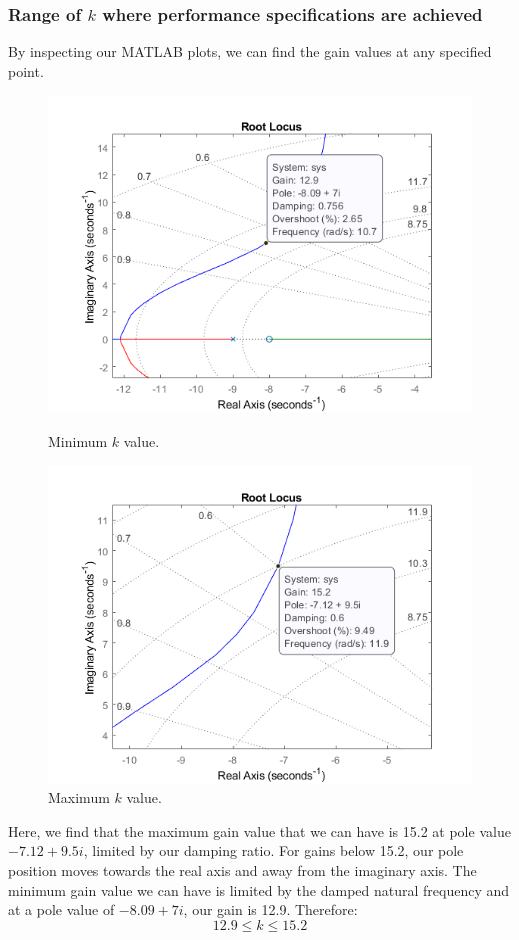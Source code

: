 \documentclass[11pt]{article}
\numberwithin{equation}{section}
\begin{document}
\subsubsection{Range of $k$ where performance specifications are achieved}
By inspecting our MATLAB plots, we can find the gain values at any specified point.
\begin{figure}[H]
    \centering
    \begin{minipage}{.5\textwidth}
        \centering
        \includegraphics[width = \linewidth]{./img/q3ciii1.png}
        \caption{Minimum $k$ value.}
        \label{q3ciii1}
    \end{minipage}%
    \begin{minipage}{.5\textwidth}
        \centering
        \includegraphics[width = \linewidth]{./img/q3ciii2.png}
        \caption{Maximum $k$ value.}
        \label{q3ciii2}
    \end{minipage}
\end{figure}
Here, we find that the maximum gain value that we can have is 15.2 at pole value $-7.12 + 9.5i$, limited by our damping ratio. For gains below 15.2, our pole position moves towards the real axis and away from the imaginary axis. The minimum gain value we can have is limited by the damped natural frequency and at a pole value of $-8.09 + 7i$, our gain is 12.9. Therefore:
\begin{equation}
    12.9 \leq k \leq 15.2
\end{equation}
\end{document}
